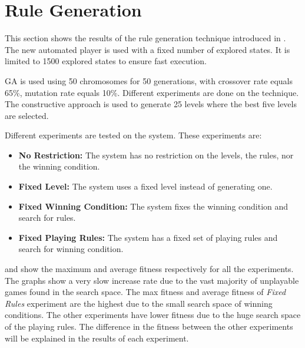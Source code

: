 \section{Rule Generation}
This section shows the results of the rule generation technique introduced in . The new automated player is used with a fixed number of explored states. It is limited to 1500 explored states to ensure fast execution.\\\par

GA is used using 50 chromosomes for 50 generations, with crossover rate equals 65\%, mutation rate equals 10\%. Different experiments are done on the technique. The constructive approach is used to generate 25 levels where the best five levels are selected.\\\par

Different experiments are tested on the system. These experiments are:
\begin{itemize}
	\item \textbf{No Restriction:} The system has no restriction on the levels, the rules, nor the winning condition.
	\item \textbf{Fixed Level:} The system uses a fixed level instead of generating one.
	\item \textbf{Fixed Winning Condition:} The system fixes the winning condition and search for rules.
	\item \textbf{Fixed Playing Rules:} The system has a fixed set of playing rules and search for winning condition. 
\end{itemize}

 and  show the maximum and average fitness respectively for all the experiments. The graphs show a very slow increase rate due to the vast majority of unplayable games found in the search space. The max fitness and average fitness of \emph{Fixed Rules} experiment are the highest due to the small search space of winning conditions. The other experiments have lower fitness due to the huge search space of the playing rules. The difference in the fitness between the other experiments will be explained in the results of each experiment.




